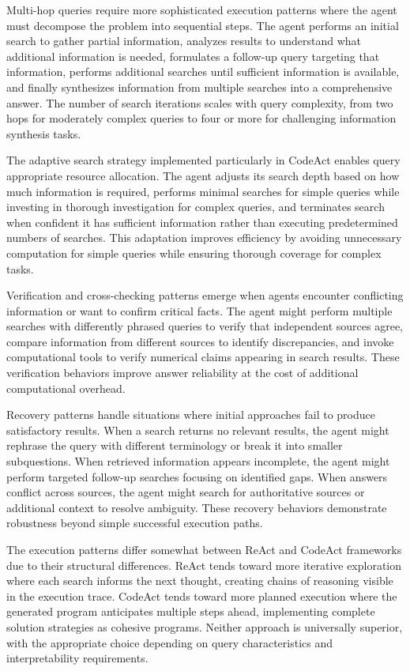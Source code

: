 Multi-hop queries require more sophisticated execution patterns where the agent must decompose the problem into sequential steps. The agent performs an initial search to gather partial information, analyzes results to understand what additional information is needed, formulates a follow-up query targeting that information, performs additional searches until sufficient information is available, and finally synthesizes information from multiple searches into a comprehensive answer. The number of search iterations scales with query complexity, from two hops for moderately complex queries to four or more for challenging information synthesis tasks.

The adaptive search strategy implemented particularly in CodeAct enables query appropriate resource allocation. The agent adjusts its search depth based on how much information is required, performs minimal searches for simple queries while investing in thorough investigation for complex queries, and terminates search when confident it has sufficient information rather than executing predetermined numbers of searches. This adaptation improves efficiency by avoiding unnecessary computation for simple queries while ensuring thorough coverage for complex tasks.

Verification and cross-checking patterns emerge when agents encounter conflicting information or want to confirm critical facts. The agent might perform multiple searches with differently phrased queries to verify that independent sources agree, compare information from different sources to identify discrepancies, and invoke computational tools to verify numerical claims appearing in search results. These verification behaviors improve answer reliability at the cost of additional computational overhead.

Recovery patterns handle situations where initial approaches fail to produce satisfactory results. When a search returns no relevant results, the agent might rephrase the query with different terminology or break it into smaller subquestions. When retrieved information appears incomplete, the agent might perform targeted follow-up searches focusing on identified gaps. When answers conflict across sources, the agent might search for authoritative sources or additional context to resolve ambiguity. These recovery behaviors demonstrate robustness beyond simple successful execution paths.

The execution patterns differ somewhat between ReAct and CodeAct frameworks due to their structural differences. ReAct tends toward more iterative exploration where each search informs the next thought, creating chains of reasoning visible in the execution trace. CodeAct tends toward more planned execution where the generated program anticipates multiple steps ahead, implementing complete solution strategies as cohesive programs. Neither approach is universally superior, with the appropriate choice depending on query characteristics and interpretability requirements.

